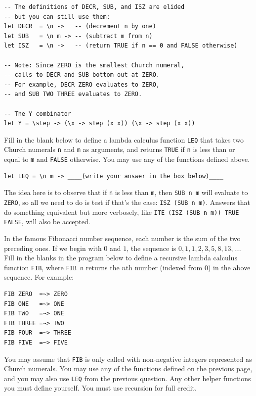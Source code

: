 \documentclass[addpoints]{exam}
\begin{document}
\begin{questions}
\begin{verbatim}
-- The definitions of DECR, SUB, and ISZ are elided
-- but you can still use them:
let DECR  = \n ->   -- (decrement n by one)
let SUB   = \n m -> -- (subtract m from n)
let ISZ   = \n ->   -- (return TRUE if n == 0 and FALSE otherwise)

-- Note: Since ZERO is the smallest Church numeral,
-- calls to DECR and SUB bottom out at ZERO.
-- For example, DECR ZERO evaluates to ZERO,
-- and SUB TWO THREE evaluates to ZERO.

-- The Y combinator
let Y = \step -> (\x -> step (x x)) (\x -> step (x x))
\end{verbatim}

\question[5] Fill in the blank below to define a lambda calculus function \texttt{LEQ} that takes two Church numerals \texttt{n} and \texttt{m} as arguments, and returns \texttt{TRUE} if \texttt{n} is less than or equal to \texttt{m} and \texttt{FALSE} otherwise.  You may use any of the functions defined above.

\begin{verbatim}
let LEQ = \n m -> ____(write your answer in the box below)____
\end{verbatim}

\begin{solutionorbox}[1in]
The idea here is to observe that if \texttt{n} is less than \texttt{m}, then \texttt{SUB n m} will evaluate to \texttt{ZERO}, so all we need to do is test if that's the case: \texttt{ISZ (SUB n m)}.  Answers that do something equivalent but more verbosely, like \texttt{ITE (ISZ (SUB n m)) TRUE FALSE}, will also be accepted.
\end{solutionorbox}

\newpage

\question In the famous Fibonacci number sequence, each number is the sum of the two preceding ones.  If we begin with $0$ and $1$, the sequence is $0, 1, 1, 2, 3, 5, 8, 13, \dots$.  Fill in the blanks in the program below to define a recursive lambda calculus function \texttt{FIB}, where \texttt{FIB n} returns the $n$th number (indexed from 0) in the above sequence.  For example:

\begin{verbatim}
FIB ZERO  =~> ZERO
FIB ONE   =~> ONE
FIB TWO   =~> ONE
FIB THREE =~> TWO
FIB FOUR  =~> THREE
FIB FIVE  =~> FIVE
\end{verbatim}

You may assume that \texttt{FIB} is only called with non-negative integers represented as Church numerals.  You may use any of the functions defined on the previous page, and you may also use \texttt{LEQ} from the previous question.  Any other helper functions you must define yourself.  You must use recursion for full credit.


\end{questions}
\end{document}
